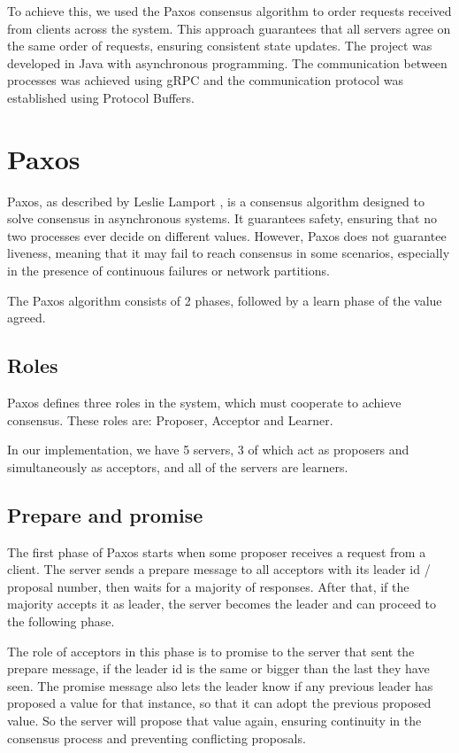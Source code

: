 \documentclass[times, 10pt,twocolumn]{article}
\begin{document}
To achieve this, we used the Paxos consensus algorithm to order requests received from clients across the system. This approach guarantees that all servers agree on the same order of requests, ensuring consistent state updates. The project was developed in Java with asynchronous programming. The communication between processes was achieved using gRPC and the communication protocol was established using Protocol Buffers.

\section{Paxos}

Paxos, as described by Leslie Lamport \cite{ex1}, is a consensus algorithm designed to solve consensus in asynchronous systems. It guarantees safety, ensuring that no two processes ever decide on different values. However, Paxos does not guarantee liveness, meaning that it may fail to reach consensus in some scenarios, especially in the presence of continuous failures or network partitions.

The Paxos algorithm consists of 2 phases, followed by a learn phase of the value agreed.

\subsection{Roles}

Paxos defines three roles in the system, which must cooperate to achieve consensus. These roles are: Proposer, Acceptor and Learner.

In our implementation, we have 5 servers, 3 of which act as proposers and simultaneously as acceptors, and all of the servers are learners. 

\subsection{Prepare and promise}

The first phase of Paxos starts when some proposer receives a request from a client. The server sends a prepare message to all acceptors with its leader id / proposal number, then waits for a majority of responses. After that, if the majority accepts it as leader, the server becomes the leader and can proceed to the following phase.

The role of acceptors in this phase is to promise to the server that sent the prepare message, if the leader id is the same or bigger than the last they have seen. The promise message also lets the leader know if any previous leader has proposed a value for that instance, so that it can adopt the previous proposed value. So the server will propose that value again, ensuring continuity in the consensus process and preventing conflicting proposals.
\end{document}
